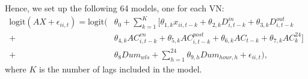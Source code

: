 Hence, we set up the following 64 models, one for each VN: 
\begin{align} \label{eq:infl_model}
	\text{logit}(AX+\epsilon_{ii,t}) = \text{logit} (&\theta_0 + \sum_{k=1}^K [ \theta_{1,k} x_{ii, t - k} 
	+ \theta_{2,k} D_{i, t - k}^{in}  + \theta_{3,k} D_{i, t - k}^{out} \nonumber\\
	+ &\theta_{4,k} AC_{i,t-k}^{vn} + \theta_{5,k} AC^{post}_{i,t-k} 
	+ \theta_{6,k} AC_{t - k} + \theta_{7,k} AC_{k}^{24} ] \\
	+ &\theta_8 Dum_{wls}+ \sum_{h=1}^{24} \theta_{9,h} Dum_{hour, h}    \nonumber 
	+ \epsilon_{ii,t} ), \nonumber
\end{align}
where $K$ is the number of lags included in the model. %
